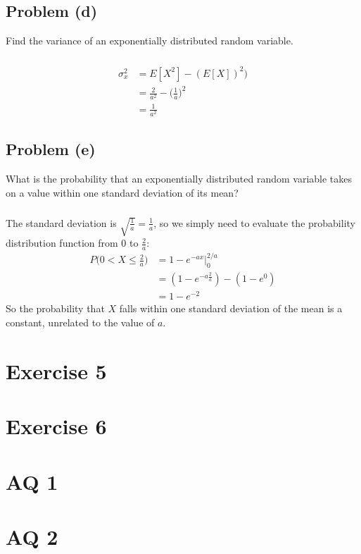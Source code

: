 \documentclass[11pt]{article}
\begin{document}
\subsection*{Problem (d)}
Find the variance of an exponentially distributed random variable.

\subparagraph*{}
\begin{align*}
	\sigma_x^2 &= E[X^2]-(E[X])^2)\\
	&= \frac{2}{a^2} - \Big(\frac{1}{a}\Big)^2 \\
	&= \frac{1}{a^2}
\end{align*}

\subsection*{Problem (e)}
What is the probability that an exponentially distributed random variable takes on a value within one standard deviation of its mean?

\subparagraph*{}
The standard deviation is $\sqrt{\frac{1}{a}}=\frac{1}{a}$, so we simply need to evaluate the probability distribution function from $0$ to $\frac{2}{a}$:
\begin{align*}
	P\Big(0<X\leq\frac{2}{a}\Big) &= 1-e^{-ax}\Big|_0^{2/a} \\
	&= (1-e^{-a\frac{2}{a}})-(1-e^0) \\
	&= 1-e^{-2}
\end{align*}
So the probability that $X$ falls within one standard deviation of the mean is a constant, unrelated to the value of $a$.

\section*{Exercise 5}

\section*{Exercise 6}

\section*{AQ 1}

\section*{AQ 2}
\end{document}
